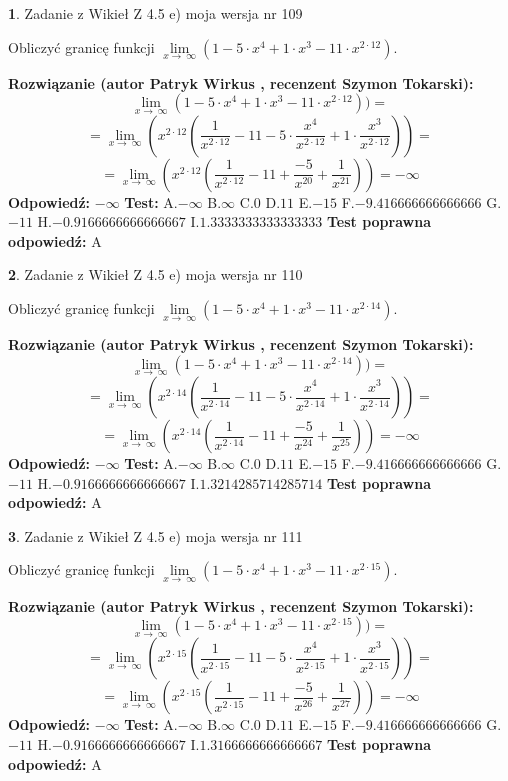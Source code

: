 \documentclass[12pt, a4paper]{article}
\theoremstyle{definition} %
\newtheorem{zad}{}
\newcommand{\zadStart}[1]{\begin{zad}#1\newline}
\newcommand{\zadStop}{\end{zad}}
\newcommand{\rozwStart}[2]{\noindent \textbf{Rozwiązanie (autor #1 , recenzent #2): }\newline}
\newcommand{\rozwStop}{\newline}
\newcommand{\odpStart}{\noindent \textbf{Odpowiedź:}\newline}
\newcommand{\odpStop}{\newline}
\newcommand{\testStart}{\noindent \textbf{Test:}\newline}
\newcommand{\testStop}{\newline}
\newcommand{\kluczStart}{\noindent \textbf{Test poprawna odpowiedź:}\newline}
\newcommand{\kluczStop}{\newline}
\begin{document}
\zadStart{Zadanie z Wikieł Z 4.5 e) moja wersja nr 109}


Obliczyć granicę funkcji  $\lim\limits_{x\to\ \infty}(1 - 5 \cdot x^{4}+1 \cdot x^{3}- 11 \cdot x^{2\cdot12})$.
\zadStop
\rozwStart{Patryk Wirkus}{Szymon Tokarski}
$$\lim\limits_{x\to\ \infty}(1 - 5 \cdot x^{4}+1 \cdot x^{3}- 11 \cdot x^{2\cdot12}))=$$
$$=\lim\limits_{x\to\ \infty}(x^{2\cdot12}(\frac{1}{x^{2\cdot12}}-11 -5 \cdot \frac{x^{4}}{x^{2\cdot12}}+1 \cdot \frac{x^{3}}{x^{2\cdot12}}))=$$
$$=\lim\limits_{x\to\ \infty}(x^{2\cdot12}(\frac{1}{x^{2\cdot12}}-11 + \frac{-5}{x^{20}}+ \frac{1}{x^{21}}))=-\infty$$
\rozwStop
\odpStart
$-\infty$
\odpStop
\testStart
A.$-\infty$ B.$\infty$ C.$0$ D.$11$ E.$-15$
F.$-9.416666666666666$ G.$-11$
H.$-0.9166666666666667$
I.$1.3333333333333333$
\testStop
\kluczStart
A
\kluczStop



\zadStart{Zadanie z Wikieł Z 4.5 e) moja wersja nr 110}


Obliczyć granicę funkcji  $\lim\limits_{x\to\ \infty}(1 - 5 \cdot x^{4}+1 \cdot x^{3}- 11 \cdot x^{2\cdot14})$.
\zadStop
\rozwStart{Patryk Wirkus}{Szymon Tokarski}
$$\lim\limits_{x\to\ \infty}(1 - 5 \cdot x^{4}+1 \cdot x^{3}- 11 \cdot x^{2\cdot14}))=$$
$$=\lim\limits_{x\to\ \infty}(x^{2\cdot14}(\frac{1}{x^{2\cdot14}}-11 -5 \cdot \frac{x^{4}}{x^{2\cdot14}}+1 \cdot \frac{x^{3}}{x^{2\cdot14}}))=$$
$$=\lim\limits_{x\to\ \infty}(x^{2\cdot14}(\frac{1}{x^{2\cdot14}}-11 + \frac{-5}{x^{24}}+ \frac{1}{x^{25}}))=-\infty$$
\rozwStop
\odpStart
$-\infty$
\odpStop
\testStart
A.$-\infty$ B.$\infty$ C.$0$ D.$11$ E.$-15$
F.$-9.416666666666666$ G.$-11$
H.$-0.9166666666666667$
I.$1.3214285714285714$
\testStop
\kluczStart
A
\kluczStop



\zadStart{Zadanie z Wikieł Z 4.5 e) moja wersja nr 111}


Obliczyć granicę funkcji  $\lim\limits_{x\to\ \infty}(1 - 5 \cdot x^{4}+1 \cdot x^{3}- 11 \cdot x^{2\cdot15})$.
\zadStop
\rozwStart{Patryk Wirkus}{Szymon Tokarski}
$$\lim\limits_{x\to\ \infty}(1 - 5 \cdot x^{4}+1 \cdot x^{3}- 11 \cdot x^{2\cdot15}))=$$
$$=\lim\limits_{x\to\ \infty}(x^{2\cdot15}(\frac{1}{x^{2\cdot15}}-11 -5 \cdot \frac{x^{4}}{x^{2\cdot15}}+1 \cdot \frac{x^{3}}{x^{2\cdot15}}))=$$
$$=\lim\limits_{x\to\ \infty}(x^{2\cdot15}(\frac{1}{x^{2\cdot15}}-11 + \frac{-5}{x^{26}}+ \frac{1}{x^{27}}))=-\infty$$
\rozwStop
\odpStart
$-\infty$
\odpStop
\testStart
A.$-\infty$ B.$\infty$ C.$0$ D.$11$ E.$-15$
F.$-9.416666666666666$ G.$-11$
H.$-0.9166666666666667$
I.$1.3166666666666667$
\testStop
\kluczStart
A
\kluczStop
\end{document}
